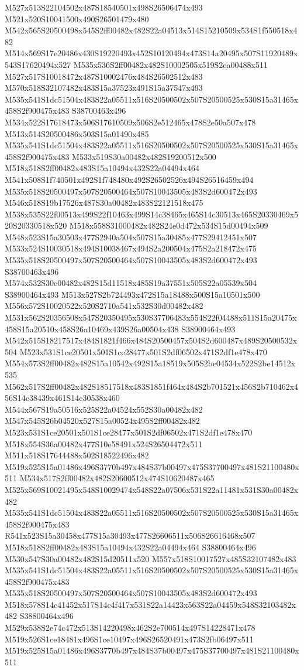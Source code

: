 \documentclass{article}
\begin{document}
\begin{multicols}{2}
M527x513S22104502x487S18540501x498S26506474x493 M521x520S10041500x490S26501479x480 M542x565S20500498x545S2ff00482x482S22a04513x514S15210509x534S1f550518x482 M514x569S17e20486x430S19220493x452S10120494x473S14a20495x507S11920489x543S17620494x527 M535x536S2ff00482x482S10002505x519S2ea00488x511 M527x517S10018472x487S10002476x484S26502512x483 M570x518S32107482x483S15a37523x491S15a37547x493 M535x541S1dc51504x483S22a05511x516S20500502x507S20500525x530S15a31465x458S2f900475x483 S38700463x496 M534x522S17618473x506S17610509x506S2e512465x478S2e50a507x478 M513x514S20500486x503S15a01490x485 M535x541S1dc51504x483S22a05511x516S20500502x507S20500525x530S15a31465x458S2f900475x483 M533x519S30a00482x482S19200512x500 M518x518S2ff00482x483S15a10494x432S22a04494x464 M541x508S1f740501x492S1f748480x492S26502526x494S26516459x494 M535x518S20500497x507S20500464x507S10043505x483S2d600472x493 M546x518S19b17526x487S30a00482x483S22121518x475 M538x535S22f00513x499S22f10463x499S14c38465x465S14c30513x465S20330469x520S20330518x520 M518x558S31000482x482S24e0d472x534S15d00494x509 M548x523S15a30503x477S2940a504x507S15a30485x477S29412451x507 M533x524S10030518x494S10038467x494S2a200504x475S2a218472x475 M535x518S20500497x507S20500464x507S10043505x483S2d600472x493 S38700463x496 M574x532S30e00482x482S15d11518x485S19a37551x505S22a05539x504 S38900464x493 M513x527S2b724493x472S15a18488x500S15a10501x500 M556x572S10020522x520S2710a541x532S30d00482x482 M531x562S20356508x547S20350495x530S37706483x554S22f04488x511S15a20475x458S15a20510x458S26a10469x439S26a00504x438 S38900464x493 M542x515S18217517x484S1821f466x484S20500457x504S2d600487x489S20500532x504 M523x531S1ce20501x501S1ce28477x501S2df06502x471S2df1e478x470 M554x573S2ff00482x482S15a10542x492S15a18519x505S2be04534x522S2be14512x535 M562x517S2ff00482x482S18517518x483S1851f464x484S2b701521x456S2b710462x456S14c38439x461S14c30538x460 M544x567S19a50516x525S22a04524x552S30a00482x482 M547x545S26b04520x527S15a00524x495S2ff00482x482 M523x531S1ce20501x501S1ce28477x501S2df06502x471S2df1e478x470 M518x554S36a00482x477S10e58491x524S26504472x511 M511x518S17644488x502S18522496x482 M519x525S15a01486x496S3770b497x484S37b00497x475S37700497x481S21100480x511 M534x517S2ff00482x482S20600512x474S10620487x465 M525x569S10021495x548S10029474x548S22a07506x531S22a11481x531S30a00482x482 M535x541S1dc51504x483S22a05511x516S20500502x507S20500525x530S15a31465x458S2f900475x483 R541x523S15a30458x477S15a30493x477S26606511x506S26616468x507 M518x518S2ff00482x483S15a10494x432S22a04494x464 S38800464x496 M530x547S30a00482x482S15d20511x520 M557x518S10017527x485S32107482x483 M535x541S1dc51504x483S22a05511x516S20500502x507S20500525x530S15a31465x458S2f900475x483 M535x518S20500497x507S20500464x507S10043505x483S2d600472x493 M518x578S14c41452x517S14c4f417x531S22a14423x563S22a04459x548S32103482x482 S38800464x496 M529x538S2e74c472x513S14220498x462S2e700514x497S14228471x478 M519x526S1ce18481x496S1ce10497x496S26520491x473S2fb06497x511 M519x525S15a01486x496S3770b497x484S37b00497x475S37700497x481S21100480x511 
\end{multicols}
\end{document}
